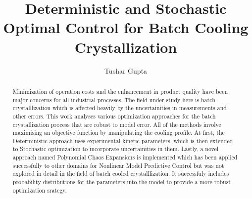 \documentclass[3p,times,authoryear]{elsarticle}
\begin{document}
\begin{frontmatter}



\dochead{}

\title{Deterministic and Stochastic Optimal Control for Batch Cooling Crystallization}


\author{Tushar Gupta}

\address{}

\begin{abstract}
Minimization of operation costs and the enhancement in product quality have been
major concerns for all industrial processes. The field under study here is batch crystalllization which is affected heavily by the uncertainities in measurements and other
errors.
This work analyses various optimization approaches for the batch crystallization process that are robust to model error. All of the methods involve maximising an objective function by manipulating the cooling profile. At first, the Deterministic approach uses experimental kinetic parameters, which is then extended to Stochastic optimization to incorporate uncertainities in them. Lastly, a novel approach named Polynomial Chaos Expansions is implemented which has been applied successfully to other domains for
Nonlinear Model Predictive Control but was not explored in detail in the field of batch
cooled crystalllization. It successfuly includes probability distributions for the parameters into the model to provide a more robust optimization srategy.


\end{abstract}
\end{frontmatter}
\end{document}
